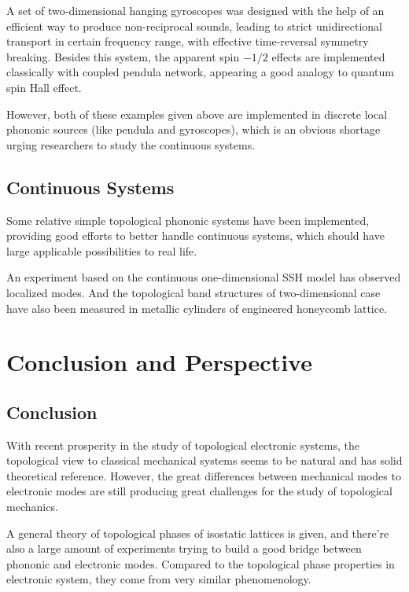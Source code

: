 \documentclass[aps,pre,preprint,groupedaddress]{revtex4-1}
\begin{document}
A set of two-dimensional hanging gyroscopes was designed with the help of an efficient way to produce non-reciprocal sounds, leading to strict unidirectional transport in certain frequency range, with effective time-reversal symmetry breaking\cite{cite-key29}. Besides this system, the apparent spin $-1/2$ effects are implemented classically with coupled pendula network, appearing a good analogy to quantum spin Hall effect\cite{cite-key30}.

However, both of these examples given above are implemented in discrete local phononic sources (like pendula and gyroscopes), which is an obvious shortage urging researchers to study the continuous systems.

\subsection{Continuous Systems}

Some relative simple topological phononic systems have been implemented, providing good efforts to better handle continuous systems, which should have large applicable possibilities to real life.

An experiment based on the continuous one-dimensional SSH model has observed localized modes\cite{cite-key31}. And the topological band structures of two-dimensional case have also been measured in metallic cylinders of engineered honeycomb lattice\cite{he2015acoustic}.

\section{Conclusion and Perspective}

\subsection{Conclusion}

With recent prosperity in the study of topological electronic systems, the topological view to classical mechanical systems seems to be natural and has solid theoretical reference. However, the great differences between mechanical modes to electronic modes are still producing great challenges for the study of topological mechanics.

A general theory of topological phases of isostatic lattices is given\cite{cite-key10}, and there're also a large amount of experiments trying to build a good bridge between phononic and electronic modes\cite{cite-key19,cite-key20,cite-key21,cite-key22,cite-key29,cite-key30,cite-key31,he2015acoustic}. Compared to the topological phase properties in electronic system, they come from very similar phenomenology. 
\end{document}
